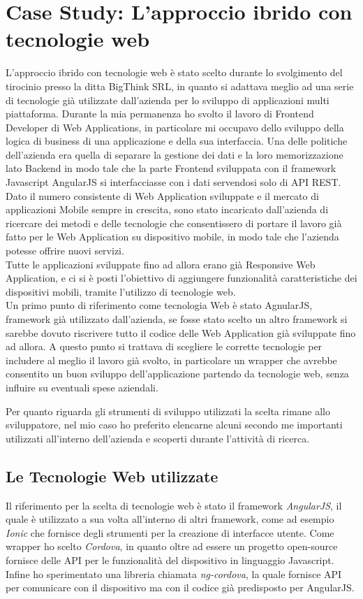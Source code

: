 \chapter{Case Study: L'approccio ibrido con tecnologie web}

L'approccio ibrido con tecnologie web è stato scelto durante lo svolgimento del tirocinio presso la ditta BigThink SRL, in quanto si adattava meglio ad una serie di tecnologie già utilizzate dall'azienda per lo sviluppo di applicazioni multi piattaforma.
Durante la mia permanenza ho svolto il lavoro di Frontend Developer di Web Applications, in particolare mi occupavo dello sviluppo della logica di business di una applicazione e della sua interfaccia.
Una delle politiche dell'azienda era quella di separare la gestione dei dati e la loro memorizzazione lato Backend in modo tale che la parte Frontend sviluppata con il framework Javascript AngularJS si interfacciasse con i dati servendosi solo di API REST.
Dato il numero consistente di Web Application sviluppate e il mercato di applicazioni Mobile sempre in crescita, sono stato incaricato dall'azienda di ricercare dei metodi e delle tecnologie che consentissero di portare il lavoro già fatto per le Web Application su dispositivo mobile, in modo tale che l'azienda potesse offrire nuovi servizi.\\
Tutte le applicazioni sviluppate fino ad allora erano già Responsive Web Application, e ci si è posti l'obiettivo di aggiungere funzionalità caratteristiche dei dispositivi mobili, tramite l'utilizzo di tecnologie web.\\

Un primo punto di riferimento come tecnologia Web è stato AgnularJS, framework già utilizzato dall'azienda, se fosse stato scelto un altro framework si sarebbe dovuto riscrivere tutto il codice delle Web Application già sviluppate fino ad allora. A questo punto  si trattava di scegliere le corrette tecnologie per includere al meglio il lavoro già svolto, in particolare un wrapper che avrebbe consentito un buon sviluppo dell'applicazione partendo da tecnologie web, senza influire su eventuali spese aziendali. 

Per quanto riguarda gli strumenti di sviluppo utilizzati la scelta rimane allo sviluppatore, nel mio caso ho preferito elencarne alcuni secondo me importanti utilizzati all'interno dell'azienda e scoperti durante l'attività di ricerca.

\section{Le Tecnologie Web utilizzate}
Il riferimento per la scelta di tecnologie web è stato il framework \emph{AngularJS}, il quale è utilizzato a sua volta all'interno di altri framework, come ad esempio \emph{Ionic} che fornisce degli strumenti per la creazione di interfacce utente. Come wrapper ho scelto \emph{Cordova}, in quanto oltre ad essere un progetto open-source fornisce delle API per le funzionalità del dispositivo in linguaggio Javascript. Infine ho sperimentato una libreria chiamata \emph{ng-cordova}, la quale fornisce API per comunicare con il dispositivo ma con il codice già predisposto per AngularJS. 


